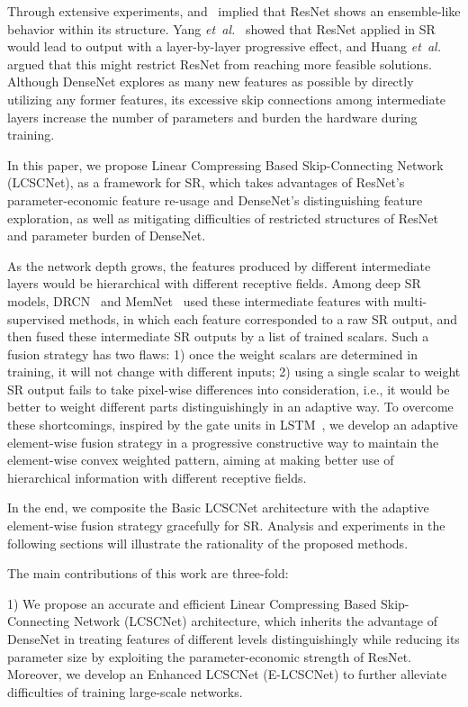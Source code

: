 \documentclass[journal]{IEEEtran}
\begin{document}
Through extensive experiments, \cite{veit2016residual} and~\cite{huang2016deep} implied that ResNet shows an ensemble-like behavior within its structure. Yang \emph{et~al.}~\cite{yang2017deep} showed that ResNet applied in SR would lead to output with a layer-by-layer progressive effect, and Huang \emph{et~al.}~\cite{huang2017densely} argued that this might restrict ResNet from reaching more feasible solutions. Although DenseNet explores as many new features as possible by directly utilizing any former features, its excessive skip connections among intermediate layers increase the number of parameters and burden the hardware during training. 



In this paper, we propose Linear Compressing Based Skip-Connecting Network (LCSCNet), as a framework for SR, which takes advantages of ResNet's parameter-economic feature re-usage and DenseNet's distinguishing feature exploration, as well as mitigating difficulties of restricted structures of ResNet and parameter burden of DenseNet.


As the network depth grows, the features produced by different intermediate layers would be hierarchical with different receptive fields. Among deep SR models, DRCN~\cite{kim2016deeply} and MemNet~\cite{Tai-MemNet-2017} used these intermediate features with multi-supervised methods, in which each feature corresponded to a raw SR output, and then fused these intermediate SR outputs by a list of trained scalars. Such a fusion strategy has two flaws: 1) once the weight scalars are determined in training, it will not change with different inputs; 2) using a single scalar to weight SR output fails to take pixel-wise differences into consideration, i.e., it would be better to weight different parts distinguishingly in an adaptive way. 
To overcome these shortcomings, inspired by the gate units in LSTM~\cite{hochreiter1997long}, we develop an adaptive element-wise fusion strategy in a progressive constructive way to maintain the element-wise convex weighted pattern, aiming at making better use of hierarchical information with different receptive fields.

In the end, we composite the Basic LCSCNet architecture with the adaptive element-wise fusion strategy gracefully for SR. Analysis and experiments in the following sections will illustrate the rationality of the proposed methods. 

The main contributions of this work are three-fold:

1) We propose an accurate and efficient Linear Compressing Based Skip-Connecting Network (LCSCNet) architecture, which inherits the advantage of DenseNet in treating features of different levels distinguishingly while reducing its parameter size by exploiting the parameter-economic strength of ResNet. Moreover, we develop an Enhanced LCSCNet (E-LCSCNet) to further alleviate difficulties of training large-scale networks.
\end{document}
